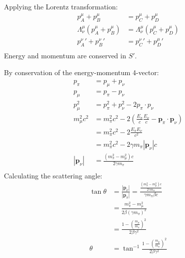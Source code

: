 \documentclass{article}
\begin{document}
Applying the Lorentz transformation:
\begin{equation}
    \begin{split}
        p_A^{\mu} + p_B^{\mu} & = p_C^{\mu} + p_D^{\mu} \\
        \Lambda_{\nu}^{\mu}\left(p_A^{\mu} + p_B^{\mu}\right) & = \Lambda_{\nu}^{\mu}\left(p_C^{\mu} + p_D^{\mu}\right) \\
        {p_A^{\nu}}' + {p_B^{\nu}}' & = {p_C^{\nu}}' + {p_D^{\mu}}' \\
    \end{split}
\end{equation}
Energy and momentum are conserved in $S'$.
\clearpage

By conservation of the energy-momentum 4-vector:
\begin{equation}
    \begin{split}
        p_{\pi} & = p_{\mu} + p_{\nu} \\
        p_{\mu} & = p_{\pi} - p_{\nu} \\
        p_{\mu}^2 & = p_{\pi}^2 + p_{\nu}^2 - 2p_{\pi} \cdot p_{\nu} \\
        m_{\mu}^2c^2 & = m_{\pi}^2c^2 - 2\left(\frac{E_{\pi}}{c}\frac{E_{\nu}}{c} - \mathbf{p}_{\pi} \cdot \mathbf{p}_{\nu}\right) \\
        & = m_{\pi}^2c^2 - 2\frac{E_{\pi}E_{\nu}}{c^2} \\
        & = m_{\pi}^2c^2 - 2\gamma m_{\pi}\left|\mathbf{p}_{\nu}\right|c \\
        \left|\mathbf{p}_{\nu}\right| & = \frac{(m_{\pi}^2 - m_{\mu}^2)c}{2\gamma m_{\pi}} \\
    \end{split}
\end{equation}
Calculating the scattering angle:
\begin{equation}
    \begin{split}
        \tan\theta & = \frac{\left|\mathbf{p}_{\nu}\right|}{\left|\mathbf{p}_{\pi}\right|} = \frac{\frac{\left(m_{\pi}^2 - m_{\mu}^2\right)c}{2\gamma m_{\pi}}}{\gamma m_{\pi}\beta c} \\
        & = \frac{m_{\pi}^2 - m_{\mu}^2}{2\beta \left(\gamma m_{\pi}\right)^2} \\
        & = \frac{1 - \left(\frac{m_{\mu}}{m_{\pi}}\right)^2}{2\beta \gamma^2} \\
        \theta & = \tan^{-1} \frac{1 - \left(\frac{m_{\mu}}{m_{\pi}}\right)^2}{2\beta \gamma^2}
    \end{split}
\end{equation}
\clearpage
\end{document}
